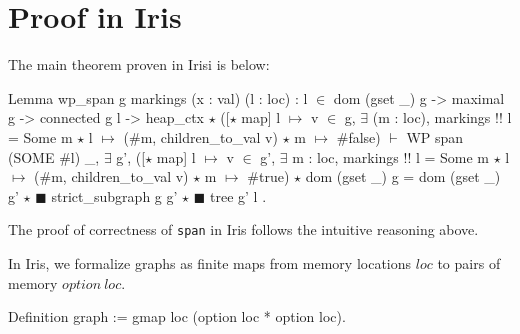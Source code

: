 \documentclass[nocopyrightspace]{sigplanconf}
\def\MyMLe{\lstinline[language=MyML, basicstyle=\small\ttfamily]}
\newcommand{\loc}{\mathit{loc}}
\newcommand{\option}{\mathit{option}}
\begin{document}
\section{Proof in Iris}
The main theorem proven in Irisi is  below:
\begin{Coq}
Lemma wp_span g markings (x : val) (l : loc) :
    l $\in$ dom (gset _) g -> maximal g -> connected g l ->
    heap_ctx $\star$
    ([$\star$ map] l $\mapsto$ v $\in$ g,
       $\exists$ (m : loc), markings !! l = Some m $\star$
          l $\mapsto$ ($\#$m, children_to_val v) $\star$ m $\mapsto$ $\#$false) $\vdash$
    WP span (SOME $\#$l)
    {{ _, $\exists$ g',
            ([$\star$ map] l $\mapsto$ v $\in$ g',
              $\exists$ m : loc, markings !! l = Some m $\star$
                l $\mapsto$ ($\#$m, children_to_val v) $\star$ m $\mapsto$ $\#$true)
           $\star$ dom (gset _) g = dom (gset _) g'
           $\star$ $\scriptscriptstyle\blacksquare$ strict_subgraph g g' $\star$ $\scriptscriptstyle\blacksquare$ tree g' l }}.
\end{Coq}

The proof of correctness of \MyMLe{span} in Iris follows the intuitive reasoning above.

In Iris, we formalize graphs as finite maps from memory locations $\mathit{loc}$ to pairs of memory $\option~\loc$.

\begin{Coq}
Definition graph := gmap loc (option loc * option loc).
\end{Coq}
\end{document}
